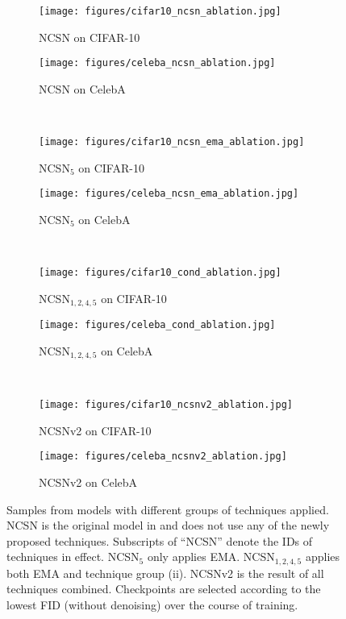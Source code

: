 \documentclass{article}
\begin{document}
\begin{figure}[H]
    \centering
    \begin{subfigure}{0.49\textwidth}
        \texttt{[image: figures/cifar10\_ncsn\_ablation.jpg]}
        \caption{NCSN on CIFAR-10}
    \end{subfigure}
    \begin{subfigure}{0.49\textwidth}
        \texttt{[image: figures/celeba\_ncsn\_ablation.jpg]}
        \caption{NCSN on CelebA}
    \end{subfigure}\\
    \begin{subfigure}{0.49\textwidth}
        \texttt{[image: figures/cifar10\_ncsn\_ema\_ablation.jpg]}
        \caption{NCSN$_5$ on CIFAR-10}
    \end{subfigure}
    \begin{subfigure}{0.49\textwidth}
        \texttt{[image: figures/celeba\_ncsn\_ema\_ablation.jpg]}
        \caption{NCSN$_5$ on CelebA}
    \end{subfigure}\\
    \begin{subfigure}{0.49\textwidth}
        \texttt{[image: figures/cifar10\_cond\_ablation.jpg]}
        \caption{NCSN$_{1,2,4,5}$ on CIFAR-10}
    \end{subfigure}
    \begin{subfigure}{0.49\textwidth}
        \texttt{[image: figures/celeba\_cond\_ablation.jpg]}
        \caption{NCSN$_{1,2,4,5}$ on CelebA}
    \end{subfigure}\\
    \begin{subfigure}{0.49\textwidth}
        \texttt{[image: figures/cifar10\_ncsnv2\_ablation.jpg]}
        \caption{NCSNv2 on CIFAR-10}
    \end{subfigure}
    \begin{subfigure}{0.49\textwidth}
        \texttt{[image: figures/celeba\_ncsnv2\_ablation.jpg]}
        \caption{NCSNv2 on CelebA}
    \end{subfigure}
    \caption{Samples from models with different groups of techniques applied. NCSN is the original model in \cite{song2019generative} and does not use any of the newly proposed techniques. Subscripts of ``NCSN'' denote the IDs of techniques in effect. NCSN$_5$ only applies EMA. NCSN$_{1,2,4,5}$ applies both EMA and technique group (ii). NCSNv2 is the result of all techniques combined. Checkpoints are selected according to the lowest FID (without denoising) over the course of training.}
    \label{fig:ablation_samples_no_denoising}
\end{figure}
\newpage
\end{document}
